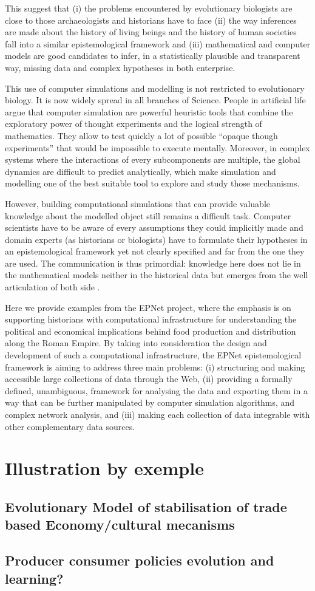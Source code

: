 \documentclass[a4paper]{article}
\begin{document}
This suggest that (i) the problems encountered by evolutionary biologists are close to those archaeologists and historians have to face (ii) the way inferences are made about the history of living beings and the history of human societies fall into a similar epistemological framework and (iii) mathematical and computer models are good candidates to infer, in a statistically plausible and transparent way, missing data and complex hypotheses in both enterprise.

This use of computer simulations and modelling is not restricted to evolutionary biology. It is now widely spread in all branches of Science. People in artificial life \cite{paolo00simulationmodelsasopaquethoughtexperiments} argue that computer simulation are powerful heuristic tools that combine the exploratory power of thought experiments and the logical strength of mathematics. They allow to test quickly a lot of possible ``opaque though experiments'' that would be impossible to execute mentally. Moreover, in complex systems where the interactions of every subcomponents are multiple, the global dynamics are difficult to predict analytically, which make simulation and modelling one of the best suitable tool to explore and study those mechanisms.


However, building computational simulations that can provide valuable knowledge about the modelled object still remains a difficult task. Computer scientists have to be aware of every assumptions they could implicitly made and domain experts (as historians or biologists) have to formulate their hypotheses in an epistemological framework yet not clearly specified and far from the one they are used. The communication is thus primordial: knowledge here does not lie in the mathematical models neither in the historical data but emerges from the well articulation of both side \cite{winsberg09taletwomethods}.

Here we provide examples from the EPNet project, where the emphasis is on supporting historians with computational infrastructure for understanding the political and economical implications behind food production and distribution along the Roman Empire. By taking into consideration the design and development of such a computational infrastructure, the EPNet epistemological framework is aiming to address three main problems: (i) structuring and making accessible large collections of data through the Web, (ii) providing a formally defined, unambiguous, framework for analysing the data and exporting them in a way that can be further manipulated by computer simulation algorithms, and complex network analysis, and (iii) making each collection of data integrable with other complementary data sources.
\section{Illustration by exemple}
\subsection{Evolutionary Model of stabilisation of trade based Economy/cultural mecanisms}
\subsection{ Producer consumer policies evolution and learning?}
\end{document}

